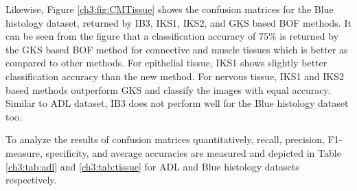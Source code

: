 Likewise, Figure \ref{ch3:fig:CMTissue} shows the confusion matrices for the Blue histology dataset, returned by IB3, IKS1, IKS2, and GKS based BOF methods. It can be seen from the figure that a classification accuracy of $75\%$ is returned by the GKS based BOF method for connective and muscle tissues which is better as compared to other methods. For epithelial tissue, IKS1 shows slightly better classification accuracy than the new method. For nervous tissue, IKS1 and IKS2 based methods outperform GKS and classify the images with equal accuracy. Similar to ADL dataset, IB3 does not perform well for the Blue histology dataset too. 

To analyze the results of confusion matrices quantitatively, recall, precision, F1-measure, specificity, and average accuracies are measured and depicted in Table \ref{ch3:tab:adl} and \ref{ch3:tab:tissue} for ADL and Blue histology datasets respectively.  

